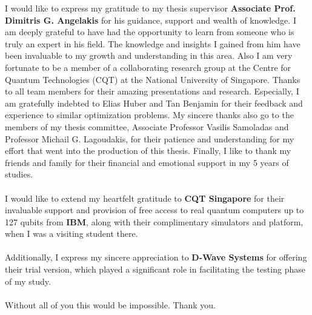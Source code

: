 \documentclass[12pt,a4paper]{report}
\begin{document}
\begin{acknowledgments}
I would like to express my gratitude to my thesis supervisor \textbf{Associate Prof. Dimitris G. Angelakis} for his guidance, support and wealth of knowledge. I am deeply grateful to have had the opportunity to learn from someone who is truly an expert in his field. The knowledge and insights I gained from him have been invaluable to my growth and understanding in this area. Also I am very fortunate to be a member of a collaborating research group at the Centre for Quantum Technologies (CQT) at the National University of Singapore. Thanks to all team members for their amazing presentations and research. Especially, I am gratefully indebted to Elias Huber and Tan Benjamin for their feedback and experience to similar optimization problems. My sincere thanks also go to the members of my thesis committee, Associate Professor Vasilis Samoladas and Professor Michail G. Lagoudakis, for their patience and understanding for my effort that went into the production of this thesis. Finally, I like to thank my friends and family for their financial and emotional support in my 5 years of studies.
\\~\\
I would like to extend my heartfelt gratitude to \textbf{CQT Singapore} for their invaluable support and provision of free access to real quantum computers up to 127 qubits from \textbf{IBM}, along with their complimentary simulators and platform, when I was a visiting student there.
\\~\\
Additionally, I express my sincere appreciation to \textbf{D-Wave Systems} for offering their trial version, which played a significant role in facilitating the testing phase of my study.
\\~\\
Without all of you this would be impossible. Thank you.

\end{acknowledgments}
\end{document}

